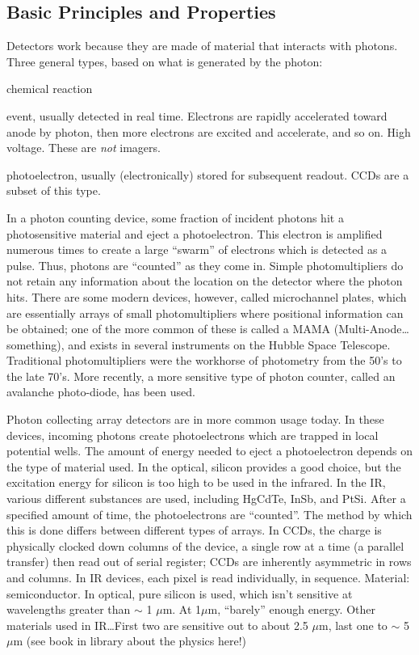\documentclass[12pt]{article}
\begin{document}
\subsection{Basic Principles and Properties}
Detectors work because they are made of material that interacts with photons.
Three general types, based on what is generated by the photon:
\begin{description}[labelwidth=10em, leftmargin=12em]
    \item [Photographic detector] chemical reaction
    \item [Photomultiplier/photon counter] event, usually detected
        in real time. Electrons are rapidly accelerated toward anode
        by photon, then more electrons are excited and accelerate, and
        so on. High voltage. These are \emph{not} imagers.
    \item [Photon collecter] photoelectron, usually (electronically)
        stored for subsequent readout. CCDs are a subset of this type.
\end{description}

In a photon counting device, some fraction of incident photons hit a
photosensitive material and eject a photoelectron. This electron is
amplified numerous times to create a large ``swarm'' of electrons
which is detected as a pulse. Thus, photons are ``counted'' as they
come in. Simple photomultipliers do not retain any information about
the location on the detector where the photon hits. There are some
modern devices, however, called microchannel plates, which are
essentially arrays of small photomultipliers where positional
information can be obtained; one of the more common of these is called
a MAMA (Multi-Anode\ldots something),
and exists in several instruments on the Hubble Space
Telescope. Traditional photomultipliers were the workhorse of
photometry from the 50's to the late 70's. More recently, a more
sensitive type of photon counter, called an avalanche photo-diode, has
been used.

Photon collecting array detectors are in more common usage today. In
these devices, incoming photons create photoelectrons which are
trapped in local potential wells. The amount of energy needed to eject
a photoelectron depends on the type of material used. In the optical,
silicon provides a good choice, but the excitation energy for silicon
is too high to be used in the infrared. In the IR, various different
substances are used, including HgCdTe, InSb, and PtSi. After a
specified amount of time, the photoelectrons are ``counted''. The
method by which this is done differs between different types of
arrays. In CCDs, the charge is physically clocked down columns of the
device, a single row at a time (a parallel transfer) then read out of
serial register; CCDs are inherently asymmetric in rows and columns.
In IR devices, each pixel is read individually, in sequence.
\textcolor{myBlue}{Material: semiconductor. In optical, pure silicon
is used, which isn't sensitive at wavelengths greater than $\sim$
1 $\mu$m. At 1$\mu$m, ``barely'' enough energy. Other materials used
in IR\ldots First two are sensitive out to about 2.5 $\mu$m, last one
to $\sim$ 5 $\mu$m (see book in library about the physics here!)}
\end{document}
